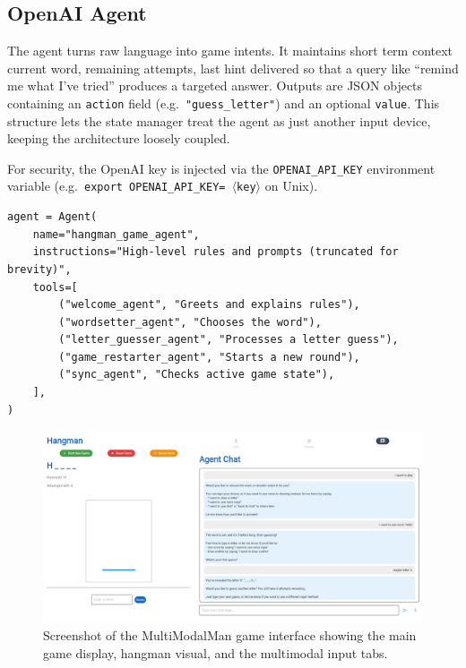\subsection*{OpenAI Agent}

The agent turns raw language into game intents. It maintains short term context current word, remaining attempts, last hint delivered so that a query like “remind me what I’ve tried” produces a targeted answer.  
Outputs are JSON objects containing an \texttt{action} field (e.g.\ \texttt{"guess\_letter"}) and an optional \texttt{value}.  
This structure lets the state manager treat the agent as just another input device, keeping the architecture loosely coupled.

For security, the OpenAI key is injected via the \texttt{OPENAI\_API\_KEY} environment variable (e.g.\ \texttt{export OPENAI\_API\_KEY=\,$\langle$key$\rangle$} on Unix).

\begin{lstlisting}[style=pystyle,
                   caption={Essential agent scaffold},
                   label={lst:agent}]
agent = Agent(
    name="hangman_game_agent",
    instructions="High-level rules and prompts (truncated for brevity)",
    tools=[
        ("welcome_agent", "Greets and explains rules"),
        ("wordsetter_agent", "Chooses the word"),
        ("letter_guesser_agent", "Processes a letter guess"),
        ("game_restarter_agent", "Starts a new round"),
        ("sync_agent", "Checks active game state"),
    ],
)
\end{lstlisting}

\begin{figure}[t]
  \center
  \includegraphics[width=1\textwidth]{images/ui-view.png}
  \caption{Screenshot of the MultiModalMan game interface showing the main game display, hangman visual, and the multimodal input tabs.}
\end{figure}
